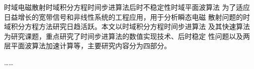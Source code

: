 
\begin{Cabstract}{时域电磁散射}{时域积分方程}{时间步进算法}{后时不稳定性}{时域平面波算法}
为了适应日益增长的宽带信号和非线性系统的工程应用，用于分析瞬态电磁
散射问题的时域积分方程方法研究日趋活跃。本文以时域积分方程时间步进算法
及其快速算法为研究课题，重点研究了时间步进算法的数值实现技术、后时稳定
性问题以及两层平面波算法加速计算等，主要研究内容分为四部分。

……
\end{Cabstract}
